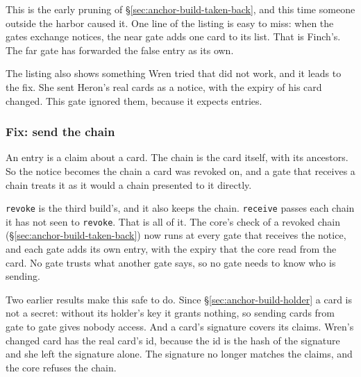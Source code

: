 This is the early pruning of \S\ref{sec:anchor-build-taken-back}, and this
time someone outside the harbor caused it. One line of the listing is easy
to miss: when the gates exchange notices, the near gate adds one card to its
list. That is Finch's. The far gate has forwarded the false entry as its
own.

The listing also shows something Wren tried that did not work, and it
leads to the fix. She sent Heron's real cards as a notice, with the expiry
of his card changed. This gate ignored them, because it expects entries.

\subsubsection{Fix: send the chain}

An entry is a claim about a card. The chain is the card itself, with its
ancestors. So the notice becomes the chain a card was revoked on,
and a gate that receives a chain treats it as it would a chain presented
to it directly.


\texttt{revoke} is the third build's, and it also keeps the chain.
\texttt{receive} passes each chain it has not seen to \texttt{revoke}. That
is all of it. The core's check of a revoked chain
(\S\ref{sec:anchor-build-taken-back}) now runs at every gate that receives
the notice, and each gate adds its own entry, with the expiry that the core
read from the card. No gate trusts what another gate says, so no gate
needs to know who is sending.

Two earlier results make this safe to do. Since
\S\ref{sec:anchor-build-holder} a card is not a secret: without its
holder's key it grants nothing, so sending cards from gate to gate gives
nobody access. And a card's signature covers its claims. Wren's changed
card has the real card's id, because the id is the hash of the signature
and she left the signature alone. The signature no longer matches the
claims, and the core refuses the chain.

\pagebreak[0]

